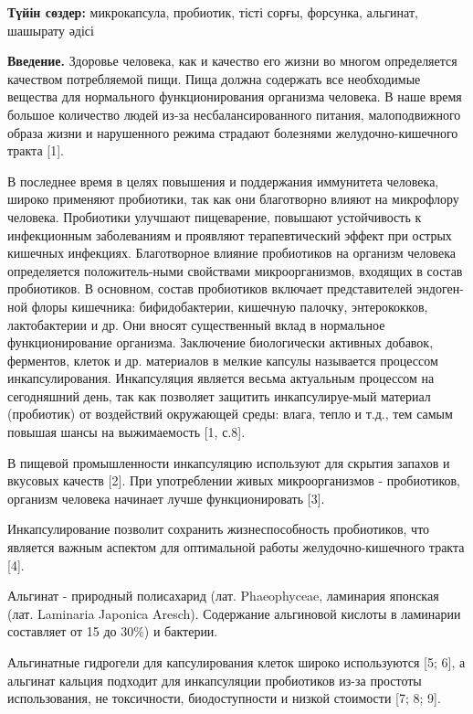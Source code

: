 {\bfseries Түйін сөздер:} микрокапсула, пробиотик, тісті сорғы, форсунка,
альгинат, шашырату әдісі
\begin{multicols}{2}

{\bfseries Введение.} Здоровье человека, как и качество его жизни во многом
определяется качеством потребляемой пищи. Пища должна содержать все
необходимые вещества для нормального функционирования организма
человека. В наше время большое количество людей из-за
несбалансированного питания, малоподвижного образа жизни и нарушенного
режима страдают болезнями желудочно-кишечного тракта {[}1{]}.

В последнее время в целях повышения и поддержания иммунитета человека,
широко применяют пробиотики, так как они благотворно влияют на
микрофлору человека. Пробиотики улучшают пищеварение, повышают
устойчивость к инфекционным заболеваниям и проявляют терапевтический
эффект при острых кишечных инфекциях. Благотворное влияние пробиотиков
на организм человека определяется положитель-ными свойствами
микроорганизмов, входящих в состав пробиотиков. В основном, состав
пробиотиков включает представителей эндоген-ной флоры кишечника:
бифидобактерии, кишечную палочку, энтерококков, лактобактерии и др. Они
вносят существенный вклад в нормальное функционирование организма.
Заключение биологически активных добавок, ферментов, клеток и др.
материалов в мелкие капсулы называется процессом инкапсулирования.
Инкапсуляция является весьма актуальным процессом на сегодняшний день,
так как позволяет защитить инкапсулируе-мый материал (пробиотик) от
воздействий окружающей среды: влага, тепло и т.д., тем самым повышая
шансы на выжимаемость {[}1, с.8{]}.

В пищевой промышленности инкапсуляцию используют для скрытия запахов и
вкусовых качеств {[}2{]}. При употреблении живых микроорганизмов -
пробиотиков, организм человека начинает лучше функционировать {[}3{]}.

Инкапсулирование позволит сохранить жизнеспособность пробиотиков, что
является важным аспектом для оптимальной работы желудочно-кишечного
тракта {[}4{]}.

Альгинат - природный полисахарид (лат. Phaeophyceae, ламинария японская
(лат. Laminaria Japonica Aresch). Содержание альгиновой кислоты в
ламинарии составляет от 15 до 30\%) и бактерии.

Альгинатные гидрогели для капсулирования клеток широко используются
{[}5; 6{]}, а альгинат кальция подходит для инкапсуляции пробиотиков
из-за простоты использования, не токсичности, биодоступности и низкой
стоимости {[}7; 8; 9{]}.


\end{multicols}
